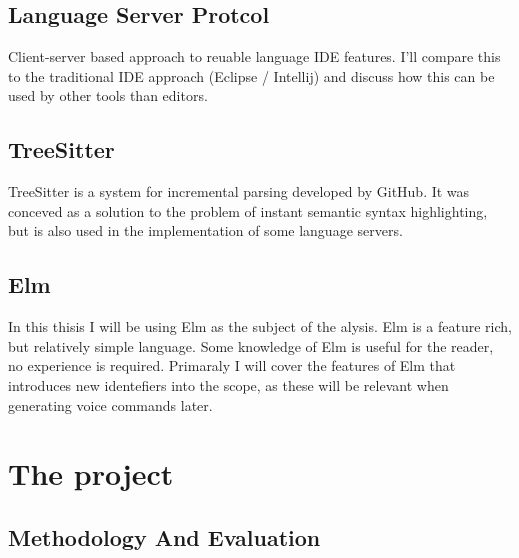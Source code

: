 \documentclass[a4paper,english]{ifimaster}
\begin{document}
\section{Language Server Protcol}
Client-server based approach to reuable language IDE features.
I'll compare this to the traditional IDE approach (Eclipse / Intellij)
and discuss how this can be used by other tools than editors.

\section{TreeSitter}
TreeSitter is a system for incremental parsing developed by GitHub.
It was conceved as a solution to the problem of instant semantic syntax highlighting,
but is also used in the implementation of some language servers.

\section{Elm}
In this thisis I will be using Elm as the subject of the alysis.
Elm is a feature rich, but relatively simple language.
Some knowledge of Elm is useful for the reader, no experience is required.
Primaraly I will cover the features of Elm that introduces new identefiers into the scope,
as these will be relevant when generating voice commands later.

\chapter{The project}

\section{Methodology And Evaluation}

\backmatter{}
\printbibliography{}
\end{document}
